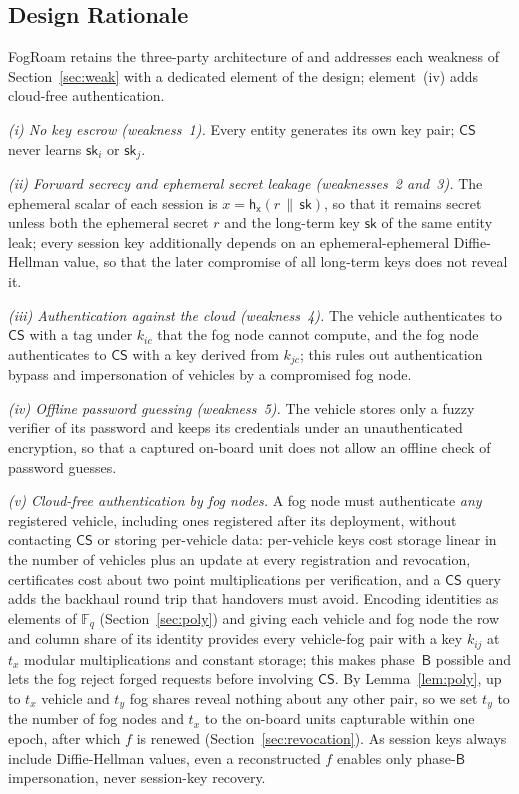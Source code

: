 \documentclass[journal]{IEEEtran}
\theoremstyle{plain}
\theoremstyle{definition}
\newcommand{\CS}{\mathsf{CS}}            %
\newcommand{\h}{\mathsf{h}}              %
\newcommand{\hT}[1]{\h_{\mathsf{#1}}}     %
\newcommand{\sk}{\mathsf{sk}}            %
\newcommand{\cat}{\,\|\,}               %
\newcommand{\protocol}{\textsf{FogRoam}}   %
\begin{document}
\subsection{Design Rationale}\label{sec:rationale}
{\protocol} retains the three-party architecture of \cite{chen2024provably} and addresses each weakness of Section~\ref{sec:weak} with a dedicated element of the design; element~(iv) adds cloud-free authentication.

\emph{(i) No key escrow (weakness~1).} Every entity generates its own key pair; $\CS$ never learns $\sk_i$ or $\sk_j$.

\emph{(ii) Forward secrecy and ephemeral secret leakage (weaknesses~2 and~3).} The ephemeral scalar of each session is $x=\hT{x}(r\cat\sk)$, so that it remains secret unless both the ephemeral secret $r$ and the long-term key $\sk$ of the same entity leak; every session key additionally depends on an ephemeral-ephemeral Diffie-Hellman value, so that the later compromise of all long-term keys does not reveal it.

\emph{(iii) Authentication against the cloud (weakness~4).} The vehicle authenticates to $\CS$ with a tag under $k_{ic}$ that the fog node cannot compute, and the fog node authenticates to $\CS$ with a key derived from $k_{jc}$; this rules out authentication bypass and impersonation of vehicles by a compromised fog node.

\emph{(iv) Offline password guessing (weakness~5).} The vehicle stores only a fuzzy verifier of its password and keeps its credentials under an unauthenticated encryption, so that a captured on-board unit does not allow an offline check of password guesses.

\emph{(v) Cloud-free authentication by fog nodes.} A fog node must authenticate \emph{any} registered vehicle, including ones registered after its deployment, without contacting $\CS$ or storing per-vehicle data: per-vehicle keys cost storage linear in the number of vehicles plus an update at every registration and revocation, certificates cost about two point multiplications per verification, and a $\CS$ query adds the backhaul round trip that handovers must avoid. Encoding identities as elements of $\mathbb{F}_q$ (Section~\ref{sec:poly}) and giving each vehicle and fog node the row and column share of its identity provides every vehicle-fog pair with a key $k_{ij}$ at $t_x$ modular multiplications and constant storage; this makes phase~$\mathsf{B}$ possible and lets the fog reject forged requests before involving $\CS$. By Lemma~\ref{lem:poly}, up to $t_x$ vehicle and $t_y$ fog shares reveal nothing about any other pair, so we set $t_y$ to the number of fog nodes and $t_x$ to the on-board units capturable within one epoch, after which $f$ is renewed (Section~\ref{sec:revocation}). As session keys always include Diffie-Hellman values, even a reconstructed $f$ enables only phase-$\mathsf{B}$ impersonation, never session-key recovery.
\end{document}
